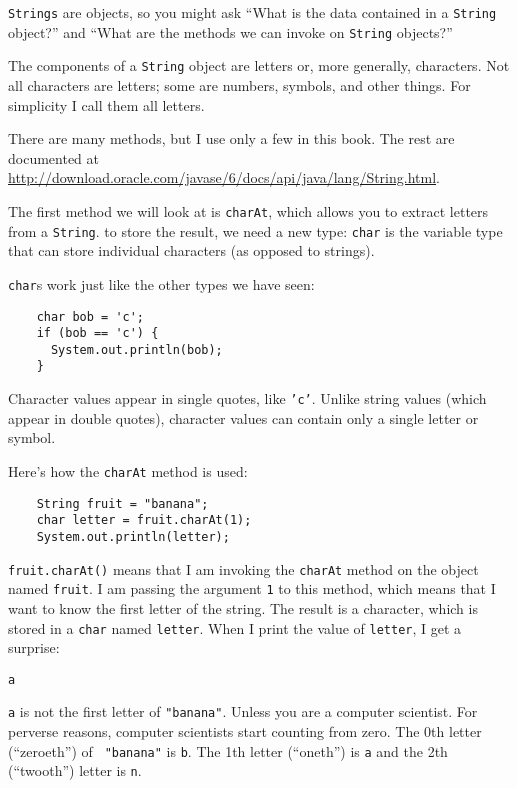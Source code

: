 \documentclass[12pt]{book}
\theoremstyle{definition}
\begin{document}
{\tt Strings} are objects,
so you might ask ``What is the data
contained in a {\tt String} object?'' and ``What are the methods we
can invoke on {\tt String} objects?''

The components of a {\tt String} object are letters or, more generally,
characters.  Not all characters are letters; some are numbers,
symbols, and other things.  For simplicity I
call them all letters.

There are many methods, but I use only a few in this
book.  The rest are documented at
\url{http://download.oracle.com/javase/6/docs/api/java/lang/String.html}.

The first method we will look at is {\tt charAt}, which allows you to
extract letters from a {\tt String}.  to store the result, we
need a new type: {\tt char} is the variable type that can store
individual characters (as opposed to strings).


{\tt char}s work just like the other types we have seen:

\begin{lstlisting}
    char bob = 'c';
    if (bob == 'c') {
      System.out.println(bob);
    }
\end{lstlisting}
%
Character values appear in single quotes, like {\tt 'c'}.  Unlike
string values (which appear in double quotes), character values
can contain only a single letter or symbol.


Here's how the {\tt charAt} method is used:

\begin{lstlisting}
    String fruit = "banana";
    char letter = fruit.charAt(1);
    System.out.println(letter);
\end{lstlisting}
%
{\tt fruit.charAt()} means that I am 
invoking the {\tt charAt} method on the object named
{\tt fruit}.
I am passing the argument {\tt 1} to this method,
which means that I want to know the first letter of
the string.  The result is a character, which is stored in a
{\tt char} named {\tt letter}.  When I print the value of
{\tt letter}, I get a surprise:

\begin{lstlisting}
a
\end{lstlisting}
%
{\tt a} is not the first letter of {\tt "banana"}.  Unless you are a
computer scientist.  For perverse reasons, computer scientists
start counting from zero.  The 0th letter (``zeroeth'') of {\tt
"banana"} is {\tt b}.  The 1th letter (``oneth'') is {\tt a} and the
2th (``twooth'') letter is {\tt n}.
\end{document}
